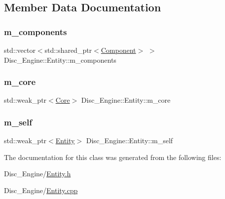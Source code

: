 \subsection{Member Data Documentation}
\mbox{\label{class_disc___engine_1_1_entity_a16f73c84e8928aab5fade057de148a27}} 
\subsubsection{\texorpdfstring{m\+\_\+components}{m\_components}}
{\footnotesize\ttfamily std\+::vector$<$std\+::shared\+\_\+ptr$<$\mbox{\hyperlink{class_disc___engine_1_1_component}{Component}}$>$ $>$ Disc\+\_\+\+Engine\+::\+Entity\+::m\+\_\+components\hspace{0.3cm}{\ttfamily [private]}}

\mbox{\label{class_disc___engine_1_1_entity_a5b1eae1a1711ee920d756812c6eb4ba6}} 
\subsubsection{\texorpdfstring{m\+\_\+core}{m\_core}}
{\footnotesize\ttfamily std\+::weak\+\_\+ptr$<$\mbox{\hyperlink{class_disc___engine_1_1_core}{Core}}$>$ Disc\+\_\+\+Engine\+::\+Entity\+::m\+\_\+core\hspace{0.3cm}{\ttfamily [private]}}

\mbox{\label{class_disc___engine_1_1_entity_a23c18419f498492049914ce84bac9c1e}} 
\subsubsection{\texorpdfstring{m\+\_\+self}{m\_self}}
{\footnotesize\ttfamily std\+::weak\+\_\+ptr$<$\mbox{\hyperlink{class_disc___engine_1_1_entity}{Entity}}$>$ Disc\+\_\+\+Engine\+::\+Entity\+::m\+\_\+self\hspace{0.3cm}{\ttfamily [private]}}



The documentation for this class was generated from the following files\+:\begin{DoxyCompactItemize}
\item 
Disc\+\_\+\+Engine/\mbox{\hyperlink{_entity_8h}{Entity.\+h}}\item 
Disc\+\_\+\+Engine/\mbox{\hyperlink{_entity_8cpp}{Entity.\+cpp}}\end{DoxyCompactItemize}
